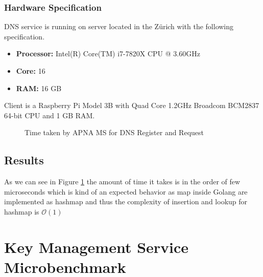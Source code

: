\subsubsection{Hardware Specification}
DNS service is running on server located in the Z\"urich with the following specification.
\begin{itemize}
    \item \textbf{Processor:} Intel(R) Core(TM) i7-7820X CPU @ 3.60GHz
    \item \textbf{Core:} 16
    \item \textbf{RAM:} 16 GB
\end{itemize}
Client is a Raspberry Pi Model 3B with Quad Core 1.2GHz Broadcom BCM2837 64-bit CPU and 1 GB RAM.
\begin{figure}[th!!]
\centering
\noindent
{}
\decoRule
\caption[DNS Operations]{Time taken by APNA MS for DNS Register and Request}
\label{fig:perf_dns}
\end{figure}

\subsection{Results}
As we can see in Figure \ref{fig:perf_dns} the amount of time it takes is in the order of few microseconds which is kind of an expected behavior as map inside Golang are implemented as hashmap and thus the complexity of insertion and lookup for hashmap is $\mathcal{O}(1)$ 

\section{Key Management Service Microbenchmark}

